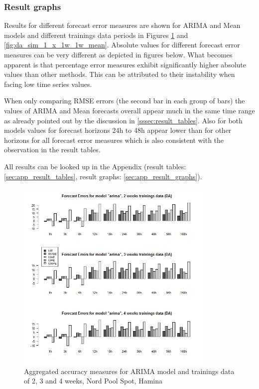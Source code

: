 \subsubsection{Result graphs}

Results for different forecast error measures are shown for ARIMA and Mean models and different trainings data periods in Figures \ref{fig:da_sim_1_x_1w_1w_arima} and \ref{fig:da_sim_1_x_1w_1w_mean}. Absolute values for different forecast error measures can be very different as depicted in figures below. What becomes apparent is that percentage error measures exhibit significantly higher absolute values than other methods. This can be attributed to their instability when facing low time series values. 

When only comparing RMSE errors (the second bar in each group of bars) the values of ARIMA and Mean forecasts overall appear much in the same time range as already pointed out by the discussion in \ref{sssec:result_tables}. Also for both models values for forecast horizons 24h to 48h appear lower than for other horizons for all forecast error measures which is also consistent with the observation in the result tables. 

All results can be looked up in the Appendix (result tables: \ref{sec:app_result_tables}, result graphs: \ref{sec:app_result_graphs}). 

\begin{figure}[htbp]
	\centering
		\includegraphics[width=0.85\textwidth]{figures/forecasting/da_sim_1_x_1w_1w_arima.png}
	\caption{Aggregated accuracy measures for ARIMA model and trainings data of 2, 3 and 4 weeks, Nord Pool Spot, Hamina}
	\label{fig:da_sim_1_x_1w_1w_arima}
\end{figure}


